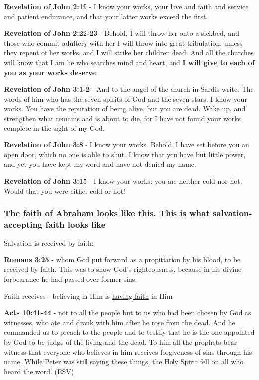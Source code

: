 \documentclass[11pt]{article}
\begin{document}
\textbf{Revelation of John 2:19} - I know your works, your love and faith and service and patient endurance, and that your latter works exceed the first.

\textbf{Revelation of John 2:22-23} - Behold, I will throw her onto a sickbed, and those who commit adultery with her I will throw into great tribulation, unless they repent of her works, and I will strike her children dead. And all the churches will know that I am he who searches mind and heart, and \textbf{I will give to each of you as your works deserve}.

\textbf{Revelation of John 3:1-2} - And to the angel of the church in Sardis write: The words of him who has the seven spirits of God and the seven stars. I know your works. You have the reputation of being alive, but you are dead. Wake up, and strengthen what remains and is about to die, for I have not found your works complete in the sight of my God.

\textbf{Revelation of John 3:8} - I know your works. Behold, I have set before you an open door, which no one is able to shut. I know that you have but little power, and yet you have kept my word and have not denied my name.

\textbf{Revelation of John 3:15} - I know your works: you are neither cold nor hot. Would that you were either cold or hot!

\subsubsection{The faith of Abraham looks like this. This is what salvation-accepting faith looks like}
\label{sec:org377759a}
Salvation is received by faith:

\textbf{Romans 3:25} - whom God put forward as a propitiation by his blood, to be received by faith. This was to show God's righteousness, because in his divine forbearance he had passed over former sins.

Faith receives - believing in Him is \uline{having faith} in Him:

\textbf{Acts 10:41-44} - not to all the people but to us who had been chosen by God as witnesses, who ate and drank with him after he rose from the dead. And he commanded us to preach to the people and to testify that he is the one appointed by God to be judge of the living and the dead. To him all the prophets bear witness that everyone who believes in him receives forgiveness of sins through his name. While Peter was still saying these things, the Holy Spirit fell on all who heard the word. (ESV)
\end{document}
